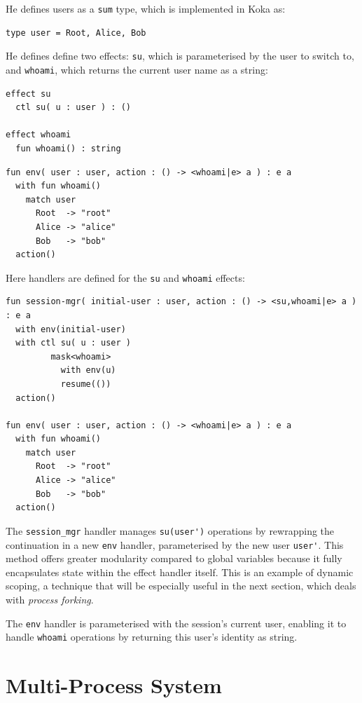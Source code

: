 \documentclass[logo,bsc,singlespacing,parskip]{infthesis}
\begin{document}
He defines users as a \lstinline{sum} type, which is implemented in Koka as:
\begin{lstlisting}
type user = Root, Alice, Bob
\end{lstlisting}

He defines define two effects: \lstinline{su}, which is parameterised by the user to switch to, and \lstinline{whoami}, which returns the current user name as a string:

\begin{lstlisting}
effect su
  ctl su( u : user ) : ()

effect whoami
  fun whoami() : string
\end{lstlisting}


\begin{lstlisting}
fun env( user : user, action : () -> <whoami|e> a ) : e a
  with fun whoami() 
    match user
      Root  -> "root"
      Alice -> "alice"
      Bob   -> "bob"
  action()
\end{lstlisting}

Here handlers are defined for the \lstinline{su} and \lstinline{whoami} effects:
\begin{lstlisting}
fun session-mgr( initial-user : user, action : () -> <su,whoami|e> a ) : e a
  with env(initial-user)
  with ctl su( u : user )
         mask<whoami>
           with env(u)
           resume(())
  action()

fun env( user : user, action : () -> <whoami|e> a ) : e a
  with fun whoami() 
    match user
      Root  -> "root"
      Alice -> "alice"
      Bob   -> "bob"
  action()
\end{lstlisting}
The \lstinline{session_mgr} handler manages \lstinline{su(user')} operations by rewrapping the continuation in a new \lstinline{env} handler, parameterised by the new user \lstinline{user'}. This method offers greater modularity compared to global variables because it fully encapsulates state within the effect handler itself. This is an example of dynamic scoping, a technique that will be especially useful in the next section, which deals with \textit{process forking}.

The \lstinline{env} handler is parameterised with the session's current user, enabling it to handle \lstinline{whoami} operations by returning this user's identity as string.


\section{Multi-Process System}
\end{document}
